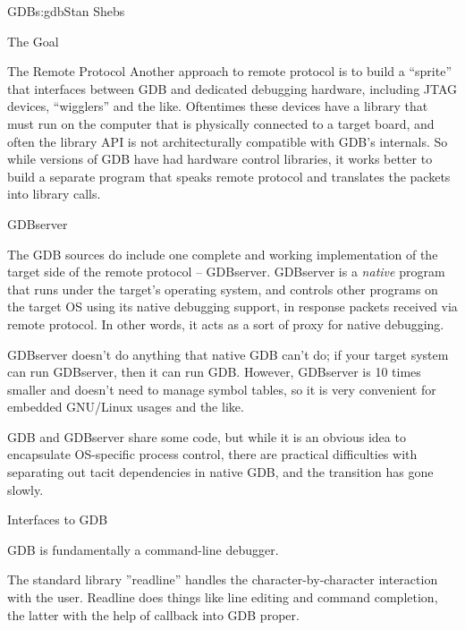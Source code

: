 \begin{aosachapter}{GDB}{s:gdb}{Stan Shebs}
\begin{aosasect1}{The Goal}
\begin{aosasect1}{The Remote Protocol}
Another approach to remote protocol is to build a ``sprite'' that
interfaces between GDB and dedicated debugging hardware, including
JTAG devices, ``wigglers'' and the like.  Oftentimes these devices
have a library that must run on the computer that is physically
connected to a target board, and often the library API is not
architecturally compatible with GDB's internals.  So while versions
of GDB have had hardware control libraries, it works better to build
a separate program that speaks remote protocol and translates the
packets into library calls.

\end{aosasect1}

\begin{aosasect1}{GDBserver}

The GDB sources do include one complete and working implementation of
the target side of the remote protocol -- GDBserver.  GDBserver is a
{\em native} program that runs under the target's operating system,
and controls other programs on the target OS using its native
debugging support, in response packets received via remote protocol.
In other words, it acts as a sort of proxy for native debugging.

GDBserver doesn't do anything that native GDB can't do; if your target
system can run GDBserver, then it can run GDB.  However, GDBserver is
10 times smaller and doesn't need to manage symbol tables, so it is very
convenient for embedded GNU/Linux usages and the like.


GDB and GDBserver share some code, but while it is an obvious idea to
encapsulate OS-specific process control, there are practical difficulties
with separating out tacit dependencies in native GDB, and the transition
has gone slowly.

\end{aosasect1}



\begin{aosasect1}{Interfaces to GDB}

GDB is fundamentally a command-line debugger.

The standard library ''readline'' handles the character-by-character interaction
with the user.  Readline does things like line editing and command completion, the
latter with the help of callback into GDB proper.


\end{aosasect1}
\end{aosasect1}
\end{aosachapter}
